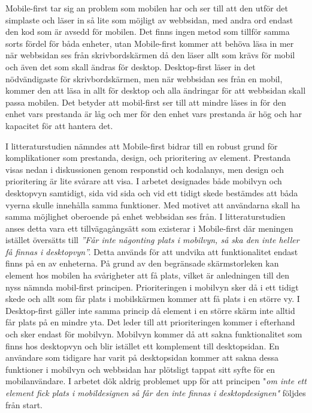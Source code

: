 \documentclass[11pt]{article}
\begin{document}
Mobile-first tar sig an problem som mobilen har och ser till att den utför det simplaste och läser in så lite som möjligt av webbsidan, med andra ord endast den kod som är avsedd för mobilen. Det finns ingen metod som tillför samma sorts fördel för båda enheter, utan Mobile-first kommer att behöva läsa in mer när webbsidan ses från skrivbordskärmen då den läser allt som krävs för mobil och även det som skall ändras för desktop. Desktop-first läser in det nödvändigaste för skrivbordskärmen, men när webbsidan ses från en mobil, kommer den att läsa in allt för desktop och alla ändringar för att webbsidan skall passa mobilen. Det betyder att mobil-first ser till att mindre läses in för den enhet vars prestanda är låg och mer för den enhet vars prestanda är hög och har kapacitet för att hantera det.

I litteraturstudien nämndes att Mobile-first bidrar till en robust grund för komplikationer som prestanda, design, och prioritering av element. Prestanda visas nedan i diskussionen genom responstid och kodalanys, men design och prioritering är lite svårare att visa. I arbetet designades både mobilvyn och desktopvyn samtidigt, sida vid sida och vid ett tidigt skede bestämdes att båda vyerna skulle innehålla samma funktioner. Med motivet att användarna skall ha samma möjlighet oberoende på enhet webbsidan ses från. I litteraturstudien anses detta vara ett tillvägagångsätt som existerar i Mobile-first där meningen istället översätts till \textit{”Får inte någonting plats i mobilvyn, så ska den inte heller få finnas i desktopvyn”.} Detta används för att undvika att funktionalitet endast finns på en av enheterna. På grund av den begränsade skärmstorleken kan element hos mobilen ha svårigheter att få plats, vilket är anledningen till den nyss nämnda mobil-first principen. Prioriteringen i mobilvyn sker då i ett tidigt skede och allt som får plats i mobilskärmen kommer att få plats i en större vy. I Desktop-first gäller inte samma princip då element i en större skärm inte alltid får plats på en mindre yta. Det leder till att prioriteringen kommer i efterhand och sker endast för mobilvyn. Mobilvyn kommer då att sakna funktionalitet som finns hos desktopvyn och blir istället ett komplement till desktopsidan. En användare som tidigare har varit på desktopsidan kommer att sakna dessa funktioner i mobilvyn och webbsidan har plötsligt tappat sitt syfte för en mobilanvändare. I arbetet dök aldrig problemet upp för att principen "\textit{om inte ett element fick plats i mobildesignen så får den inte finnas i desktopdesignen"} följdes från start.
\end{document}
